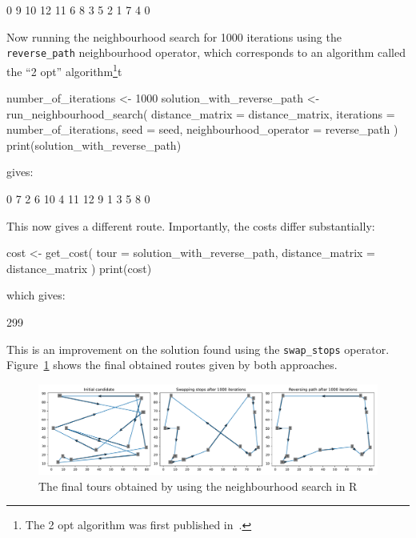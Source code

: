 \begin{Rout}
 [1]  0  9 10 12 11  6  8  3  5  2  1  7  4  0
\end{Rout}

Now running the neighbourhood search for 1000 iterations using the
\texttt{reverse_path} neighbourhood operator, which corresponds to
an algorithm called the ``2 opt'' algorithm\footnote{The 2 opt algorithm was
first published in~\autocite{croes1958method}.
}t

\begin{Rin}
number_of_iterations <- 1000
solution_with_reverse_path <- run_neighbourhood_search(
  distance_matrix = distance_matrix,
  iterations = number_of_iterations,
  seed = seed,
  neighbourhood_operator = reverse_path
)
print(solution_with_reverse_path)
\end{Rin}

gives:

\begin{Rout}
 [1]  0  7  2  6 10  4 11 12  9  1  3  5  8  0
\end{Rout}

This now gives a different route.
Importantly, the costs differ substantially:

\begin{Rin}
cost <- get_cost(
  tour = solution_with_reverse_path,
  distance_matrix = distance_matrix
)
print(cost)
\end{Rin}

which gives:

\begin{Rout}
[1] 299
\end{Rout}

This is an improvement on the solution found using the \texttt{swap_stops}
operator. Figure~\ref{fig:final-tsp-tours-r} shows the final obtained routes
given by both approaches.


\begin{figure}
    \begin{center}
        \includegraphics[width=\textwidth]{./assets/final-tsp-tours-with-R/main.pdf}
    \end{center}
    \caption{The final tours obtained by using the neighbourhood search in R}
    \label{fig:final-tsp-tours-r}
\end{figure}


